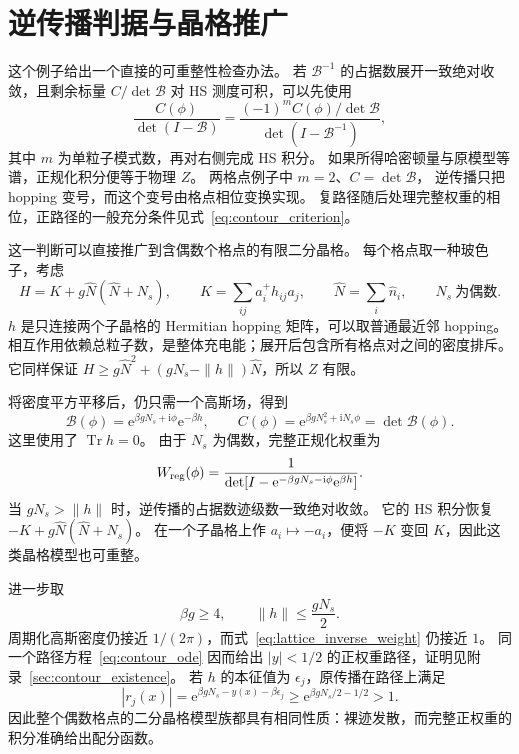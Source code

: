 \documentclass[UTF8,11pt,a4paper,fontset=fandol]{ctexart}
\newcommand{\Tr}{\operatorname{Tr}}
\newcommand{\ee}{\mathrm e}
\newcommand{\ii}{\mathrm i}
\numberwithin{equation}{section}
\begin{document}
\section{逆传播判据与晶格推广}
\label{sec:inverse_criterion}

这个例子给出一个直接的可重整性检查办法。
若 $\mathcal B^{-1}$ 的占据数展开一致绝对收敛，且剩余标量 $C/\det\mathcal B$ 对 HS 测度可积，可以先使用
\begin{equation}
 \frac{C(\phi)}{\det(I-\mathcal B)}
 =\frac{(-1)^m C(\phi)/\det\mathcal B}
        {\det(I-\mathcal B^{-1})},
 \label{eq:inverse_criterion}
\end{equation}
其中 $m$ 为单粒子模式数，再对右侧完成 HS 积分。
如果所得哈密顿量与原模型等谱，正规化积分便等于物理 $Z$。
两格点例子中 $m=2$、$C=\det\mathcal B$，
逆传播只把 hopping 变号，而这个变号由格点相位变换实现。
复路径随后处理完整权重的相位，正路径的一般充分条件见式~\eqref{eq:contour_criterion}。

这一判断可以直接推广到含偶数个格点的有限二分晶格。
每个格点取一种玻色子，考虑
\begin{equation}
 H=K+g\hat N(\hat N+N_s),\qquad
 K=\sum_{ij}a_i^+h_{ij}a_j,\qquad
 \hat N=\sum_i\hat n_i,\qquad N_s\ \text{为偶数}.
 \label{eq:charging_lattice}
\end{equation}
$h$ 是只连接两个子晶格的 Hermitian hopping 矩阵，可以取普通最近邻 hopping。
相互作用依赖总粒子数，是整体充电能；展开后包含所有格点对之间的密度排斥。
它同样保证
$H\ge g\hat N^2+(gN_s-\|h\|)\hat N$，所以 $Z$ 有限。

将密度平方平移后，仍只需一个高斯场，得到
\begin{equation}
 \mathcal B(\phi)=\ee^{\beta gN_s+\ii\phi}\ee^{-\beta h},
 \qquad C(\phi)=\ee^{\beta gN_s^2+\ii N_s\phi}
              =\det\mathcal B(\phi).
\end{equation}
这里使用了 $\Tr h=0$。
由于 $N_s$ 为偶数，完整正规化权重为
\begin{equation}
 W_{\rm reg}(\phi)
 =\frac1{\det[I-\ee^{-\beta gN_s-\ii\phi}\ee^{\beta h}]}.
 \label{eq:lattice_inverse_weight}
\end{equation}
当 $gN_s>\|h\|$ 时，逆传播的占据数迹级数一致绝对收敛。
它的 HS 积分恢复 $-K+g\hat N(\hat N+N_s)$。
在一个子晶格上作 $a_i\mapsto-a_i$，便将 $-K$ 变回 $K$，因此这类晶格模型也可重整。

进一步取
\begin{equation}
 \beta g\ge4,\qquad \|h\|\le\frac{gN_s}{2}.
 \label{eq:lattice_contour_domain}
\end{equation}
周期化高斯密度仍接近 $1/(2\pi)$，而式~\eqref{eq:lattice_inverse_weight} 仍接近 $1$。
同一个路径方程~\eqref{eq:contour_ode} 因而给出 $|y|<1/2$ 的正权重路径，证明见附录~\ref{sec:contour_existence}。
若 $h$ 的本征值为 $\epsilon_j$，原传播在路径上满足
\begin{equation}
 |r_j(x)|=\ee^{\beta gN_s-y(x)-\beta\epsilon_j}
 \ge\ee^{\beta gN_s/2-1/2}>1.
\end{equation}
因此整个偶数格点的二分晶格模型族都具有相同性质：裸迹发散，而完整正权重的积分准确给出配分函数。
\end{document}
